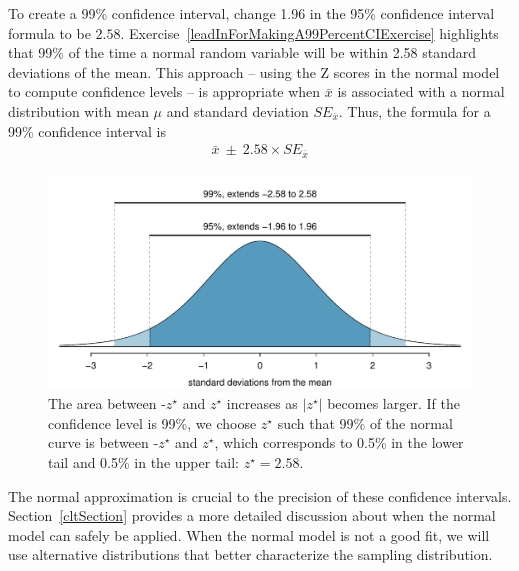 To create a 99\% confidence interval, change 1.96 in the 95\% confidence interval formula to be $2.58$. Exercise~\ref{leadInForMakingA99PercentCIExercise} highlights that 99\% of the time a normal random variable will be within 2.58 standard deviations of the mean. This approach -- using the Z scores in the normal model to compute confidence levels -- is appropriate when $\bar{x}$ is associated with a normal distribution with mean $\mu$ and standard deviation $SE_{\bar{x}}$. Thus, the formula for a 99\% confidence interval is
\begin{eqnarray}
\bar{x}\ \pm\ 2.58\times SE_{\bar{x}}
\label{99PercCIForMean}
\end{eqnarray}

\begin{figure}
\centering
\includegraphics[width=\textwidth]{ch_inference_foundations/figures/choosingZForCI/choosingZForCI}
\caption{The area between -$z^{\star}$ and $z^{\star}$ increases as $|z^{\star}|$ becomes larger. If the confidence level is 99\%, we choose $z^{\star}$ such that 99\% of the normal curve is between -$z^{\star}$ and $z^{\star}$, which corresponds to 0.5\% in the lower tail and 0.5\% in the upper tail: $z^{\star}=2.58$.}
\label{choosingZForCI}
\end{figure}

The normal approximation is crucial to the precision of these confidence intervals. Section~\ref{cltSection} provides a more detailed discussion about when the normal model can safely be applied. When the normal model is not a good fit, we will use alternative distributions that better characterize the sampling distribution.

